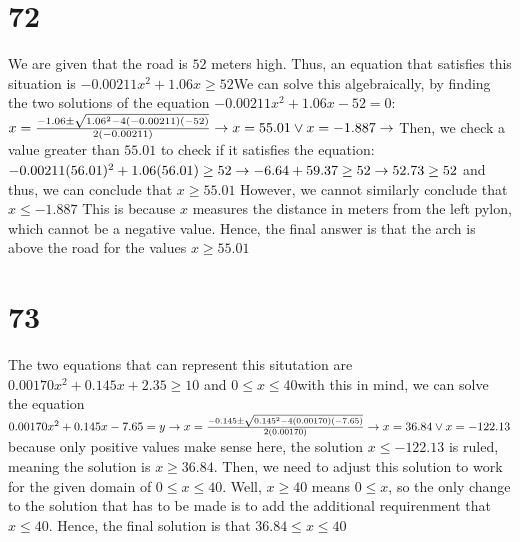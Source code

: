 \documentclass{article}
\theoremstyle{definition}
\begin{document}
\section*{72}
We are given that the road is $52$ meters high. Thus, an equation that satisfies this situation is $-0.00211x^2+1.06x\ge 52$\newline We can solve this 
algebraically, by finding the two solutions of the equation $-0.00211x^2+1.06x-52=0$:\newline 
$x=\frac{-1.06\pm\sqrt{1.06^2-4(-0.00211)(-52)}}{2(-0.00211)}\newline\rightarrow 
x=55.01\vee x=-1.887\newline\rightarrow$ 
Then, we check a value greater than $55.01$ to check if it satisfies the equation: $-0.00211(56.01)^2+1.06(56.01)\ge 52\newline\rightarrow 
-6.64+59.37\ge 52\newline\rightarrow 
52.73\ge 52$\newline 
and thus, we can conclude that $x\ge 55.01$ However, we cannot similarly conclude that $x\le -1.887$ This is because $x$ measures the distance 
in meters from the left pylon, which cannot be a negative value. Hence, the final answer is that the arch is above the road for the values 
$x\ge 55.01$

\section*{73}
The two equations that can represent this situtation are $0.00170x^2+0.145x+2.35\ge 10$ and $0\le x\le 40$\newline with this in mind, we can solve 
the equation $0.00170x^2+0.145x-7.65=y\newline\rightarrow 
x=\frac{-0.145\pm\sqrt{0.145^2-4(0.00170)(-7.65)}}{2(0.00170)}\newline\rightarrow 
x=36.84\vee x=-122.13$\newline 
because only positive values make sense here, the solution $x\le -122.13$ is ruled, meaning the solution is $x\ge 36.84$. Then, we need to adjust this 
solution to work for the given domain of $0\le x\le 40$. Well, $x\ge 40$ means $0\le x$, so the only change to the solution that has to be made 
is to add the additional requirenment that $x\le 40$. Hence, the final solution is that $36.84\le x\le 40$ 
\end{document}
